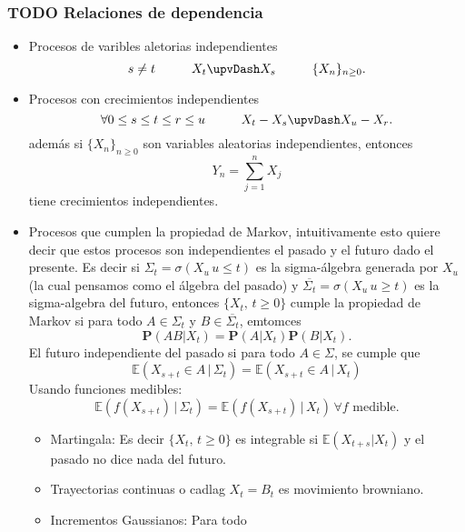 \documentclass[letterpaper]{article}
\begin{document}
\subsubsection{{\bfseries\sffamily TODO} Relaciones de dependencia}
\label{sec:org524736b}
\begin{itemize}
\item Procesos de varibles aletorias independientes
\[
   s\neq t\hspace{1cm} X_t\upvDash X_s\hspace{1cm}\{X_n\}_{n\geq 0} .
  \]
\item Procesos con crecimientos independientes
\[
   \forall 0\leq s\leq t\leq r\leq u\hspace{1cm} X_t-X_s\upvDash X_u-X_r.
  \]
además si \(\{X_n\}_{n\geq 0}\) son variables aleatorias independientes, entonces
\[
    Y_n=\sum_{j=1}^n X_j
  \]
tiene crecimientos independientes.
\item Procesos que cumplen la propiedad de Markov, intuitivamente esto quiere decir que estos procesos son independientes el pasado y el futuro dado el presente. Es decir si \(\Sigma_t=\sigma(X_u\,u\leq t)\) es la sigma-álgebra generada por \(X_u\) (la cual pensamos como el álgebra del pasado) y \(\overline{\Sigma_t}=\sigma(X_u\,u\geq t)\) es la sigma-algebra del futuro, entonces \(\{ X_t,\,t\geq 0\}\) cumple la propiedad de Markov si para todo \(A\in\Sigma_t\) y \(B\in\overline{\Sigma_t}\), emtomces
\[
       \textbf{P}(AB|X_t)=\textbf{P}(A|X_t)\textbf{P}(B|X_t).
  \]
El futuro independiente del pasado si para todo \(A\in\Sigma\), se cumple que
\[
        \mathbb{E}(X_{s+t}\in A\,|\,\Sigma_t)=\mathbb{E}(X_{s+t}\in A\,|\,X_t)
  \]
Usando funciones medibles:
\[
        \mathbb{E}(f(X_{s+t})\,|\,\Sigma_t)=\mathbb{E}(f(X_{s+t})\,|\,X_t)\,\forall f \text{ medible}.
  \]
\begin{itemize}
\item Martingala: Es decir \(\{X_t,\,t\geq0\}\) es integrable si \(\mathbb{E}(X_{t+s}|X_t)\) y el pasado no dice nada del futuro.
\item Trayectorias continuas o cadlag \(X_t=B_t\) es movimiento browniano.
\item Incrementos Gaussianos: Para todo
\end{itemize}
\end{itemize}
\end{document}
